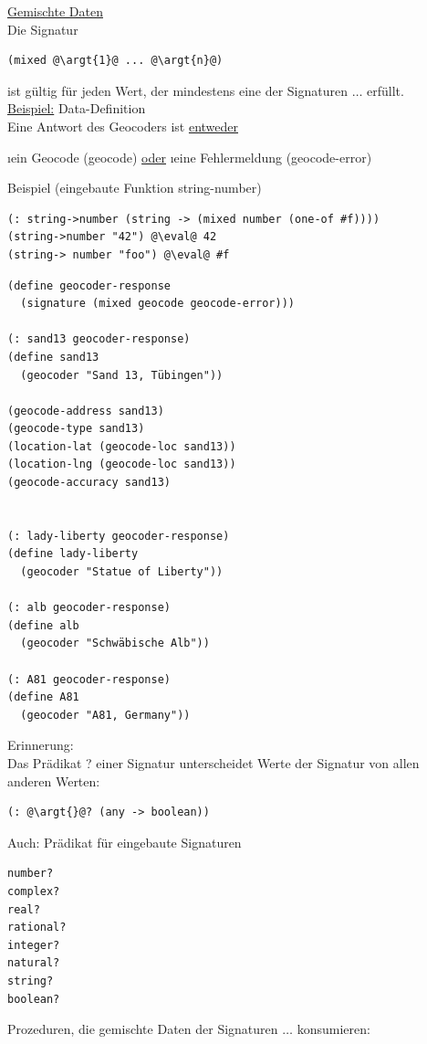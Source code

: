 \underline{Gemischte Daten}\\
Die Signatur
\begin{lstlisting}
(mixed @\argt{1}@ ... @\argt{n}@)
\end{lstlisting}
ist gültig für jeden Wert, der mindestens eine der Signaturen  $\ldots$  erfüllt.\\
\underline{Beispiel:} Data-Definition\\
Eine Antwort des Geocoders ist \underline{entweder}\\
\begin{enumerate}[-]
\i ein Geocode (geocode) \underline{oder}
\i eine Fehlermeldung (geocode-error)
\end{enumerate}
Beispiel (eingebaute Funktion string-\zu number)
\begin{lstlisting}
(: string->number (string -> (mixed number (one-of #f))))
(string->number "42") @\eval@ 42
(string-> number "foo") @\eval@ #f
\end{lstlisting}
\begin{lstlisting}[frame=single]
(define geocoder-response
  (signature (mixed geocode geocode-error)))

(: sand13 geocoder-response)
(define sand13
  (geocoder "Sand 13, Tübingen"))

(geocode-address sand13)
(geocode-type sand13)
(location-lat (geocode-loc sand13))
(location-lng (geocode-loc sand13))
(geocode-accuracy sand13)
  

(: lady-liberty geocoder-response)
(define lady-liberty
  (geocoder "Statue of Liberty"))

(: alb geocoder-response)
(define alb
  (geocoder "Schwäbische Alb"))

(: A81 geocoder-response)
(define A81
  (geocoder "A81, Germany"))
\end{lstlisting}
Erinnerung:\\
Das Prädikat \argt{}? einer Signatur \argt{} unterscheidet Werte der Signatur \argt{} von allen anderen Werten:
\begin{lstlisting}
(: @\argt{}@? (any -> boolean))
\end{lstlisting}
Auch: Prädikat für eingebaute Signaturen\\
\begin{lstlisting}
number?
complex?
real?
rational?
integer?
natural?
string?
boolean?
\end{lstlisting}
Prozeduren, die gemischte Daten der Signaturen  $\ldots$  konsumieren: \\
